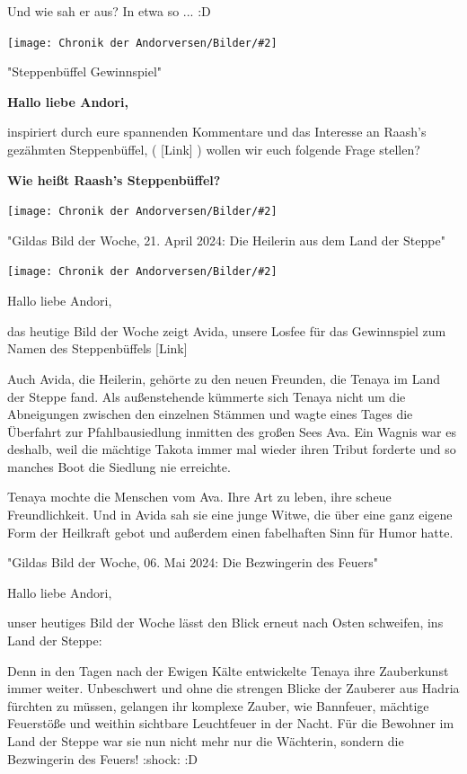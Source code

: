 \documentclass[10pt, a4paper, oneside]{book}
\newcommand{\bildmitts}[2][height=0.32\textwidth,width=0.48\textwidth,keepaspectratio]{%
    \begin{center}
        \texttt{[image: Chronik der Andorversen/Bilder/\#2]}
    \end{center}
}
\begin{document}
\begin{multicols}{2}
Und wie sah er aus? In etwa so ... :D

\bildmitts{Die Bezwingerin des Feuers 2.jpeg}



\begin{center}
    "Steppenbüffel Gewinnspiel"
\end{center}

\textbf{Hallo liebe Andori,}

inspiriert durch eure spannenden Kommentare und das Interesse an Raash's gezähmten Steppenbüffel, ( [Link] ) wollen wir euch folgende Frage stellen?

\textbf{Wie heißt Raash's Steppenbüffel?}

\bildmitts{Die Bezwingerin des Feuers 3.jpeg}



\begin{center}
    "Gildas Bild der Woche, 21. April 2024: Die Heilerin aus dem Land der Steppe"
\end{center}

\bildmitts{Die Bezwingerin des Feuers 4.jpeg}

Hallo liebe Andori,

das heutige Bild der Woche zeigt Avida, unsere Losfee für das Gewinnspiel zum Namen des Steppenbüffels [Link]

Auch Avida, die Heilerin, gehörte zu den neuen Freunden, die Tenaya im Land der Steppe fand. Als außenstehende kümmerte sich Tenaya nicht um die Abneigungen zwischen den einzelnen Stämmen und wagte eines Tages die Überfahrt zur Pfahlbausiedlung inmitten des großen Sees Ava. Ein Wagnis war es deshalb, weil die mächtige Takota immer mal wieder ihren Tribut forderte und so manches Boot die Siedlung nie erreichte.

Tenaya mochte die Menschen vom Ava. Ihre Art zu leben, ihre scheue Freundlichkeit. Und in Avida sah sie eine junge Witwe, die über eine ganz eigene Form der Heilkraft gebot und außerdem einen fabelhaften Sinn für Humor hatte.




\begin{center}
    "Gildas Bild der Woche, 06. Mai 2024: Die Bezwingerin des Feuers"
\end{center}

Hallo liebe Andori,

unser heutiges Bild der Woche lässt den Blick erneut nach Osten schweifen, ins Land der Steppe:

Denn in den Tagen nach der Ewigen Kälte entwickelte Tenaya ihre Zauberkunst immer weiter. Unbeschwert und ohne die strengen Blicke der Zauberer aus Hadria fürchten zu müssen, gelangen ihr komplexe Zauber, wie Bannfeuer, mächtige Feuerstöße und weithin sichtbare Leuchtfeuer in der Nacht. Für die Bewohner im Land der Steppe war sie nun nicht mehr nur die Wächterin, sondern die Bezwingerin des Feuers! :shock: :D


\end{multicols}
\end{document}
